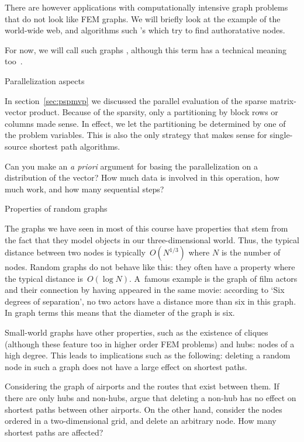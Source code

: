 There are however applications with computationally intensive graph
problems that do not look like \ac{FEM} graphs. We will briefly look
at the example of the world-wide web, and algorithms such
's  which try to find
authoratative nodes.

For now, we will call such graphs ,
although this term has a technical meaning
too~\cite{Erdos:randomgraph}.

 {Parallelization aspects}

In section~\ref{sec:pspmvp} we discussed the parallel evaluation
of the sparse matrix-vector product. Because of the sparsity, 
only a partitioning by block rows or columns made sense.
In effect, we let the partitioning be determined by one of the problem
variables. This is also the only strategy that makes sense for
single-source shortest path algorithms.

\begin{exercise}
  Can you make an \textit{a priori} argument for basing the
  parallelization on a distribution of the vector? How much data is
  involved in this operation, how much work, and how many sequential
  steps?
\end{exercise}

 {Properties of random graphs}

The graphs we have seen in most of this course have properties that
stem from the fact that they model objects in our three-dimensional
world. Thus, the typical distance between two nodes is
typically~$O(N^{1/3})$ where $N$ is the number of nodes. Random graphs
do not behave like this: they often have a 
property where the typical distance is~$O(\log N)$. A~famous example
is the graph of film actors and their connection by having appeared in
the same movie: according to `Six degrees of separation', no two actors
have a distance more than six in this graph. In graph terms this means
that the diameter of the graph is six.

Small-world graphs have other properties, such as the existence of
cliques (although these feature too in higher order \ac{FEM} problems)
and hubs: nodes of a high degree. This leads to implications such as
the following: deleting a random node in such a graph does not have a
large effect on shortest paths.

\begin{exercise}
  Considering the graph of airports and the routes that exist between
  them. If there are only hubs and non-hubs, argue that deleting a
  non-hub has no effect on shortest paths between other airports. On
  the other hand, consider the nodes ordered in a two-dimensional
  grid, and delete an arbitrary node. How many shortest paths are affected?
\end{exercise}

